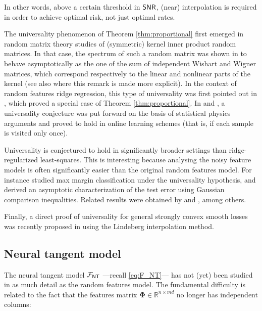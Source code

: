  In other words, above a certain threshold in ${\sf SNR}$, (near) interpolation is required in order to achieve optimal risk, not just optimal rates.

The universality phenomenon of Theorem \ref{thm:proportional} first emerged in random matrix theory studies of (symmetric) kernel inner product random matrices. In that case, the spectrum of such a random matrix was shown in \cite{cheng2013spectrum}  to behave asymptotically as the one of the sum of independent Wishart and Wigner matrices, which correspond respectively to the linear and nonlinear parts of the kernel (see also \cite{fan2019spectral} where this remark is made more explicit). In the context of random features ridge regression, this type of universality was first pointed out in \cite{hastie2019surprises}, which proved a special case of Theorem \ref{thm:proportional}.
In \cite{goldt2019modelling} and \cite{goldt2020gaussian}, a universality conjecture was put forward  on the basis of statistical physics arguments and proved to hold in online learning schemes (that is, if each sample is visited only once).

Universality is conjectured to hold in significantly broader settings than ridge-regularized least-squares. This is interesting because analysing the noisy feature models is often significantly easier than the original random features model. For instance \cite{montanari2019generalization} studied max margin classification under the universality hypothesis, and derived an asymptotic characterization of the test error using Gaussian comparison inequalities. Related results were obtained by \cite{taheri2020fundamental} and \cite{kini2020analytic}, among others.

Finally, a direct proof of universality for general strongly convex smooth losses  was recently proposed in \cite{hu2020universality} using the Lindeberg interpolation method.

\subsection{Neural tangent model}
\label{sec:NT}

The neural tangent model  ${\mathcal F}_{{\sf NT}}$  ---recall \eqref{eq:F_NT}---  has not (yet) been studied in as much detail as the random features model. The fundamental difficulty is related to the fact that the features matrix ${\boldsymbol \Phi}\in{\mathbb R}^{n\times md}$ no longer has independent columns:

